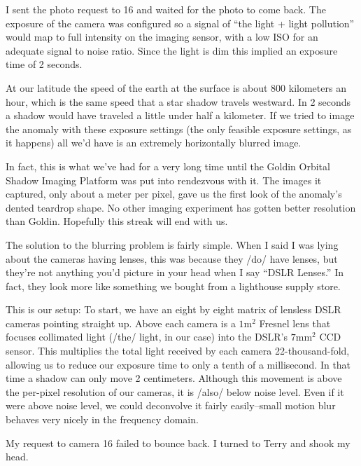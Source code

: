 \documentclass[a5paper,10pt]{book}
\begin{document}
I sent the photo request to 16 and waited for the photo to come back. The exposure of the camera was configured so a signal of ``the light + light pollution'' would map to full intensity on the imaging sensor, with a low ISO for an adequate signal to noise ratio. Since the light is dim this implied an exposure time of 2 seconds.

At our latitude the speed of the earth at the surface is about 800 kilometers an hour, which is the same speed that a star shadow travels westward. In 2 seconds a shadow would have traveled a little under half a kilometer. If we tried to image the anomaly with these exposure settings (the only feasible exposure settings, as it happens) all we'd have is an extremely horizontally blurred image.

In fact, this is what we've had for a very long time until the Goldin Orbital Shadow Imaging Platform was put into rendezvous with it. The images it captured, only about a meter per pixel, gave us the first look of the anomaly's dented teardrop shape. No other imaging experiment has gotten better resolution than Goldin. Hopefully this streak will end with us.

The solution to the blurring problem is fairly simple. When I said I was lying about the cameras having lenses, this was because they /do/ have lenses, but they're not anything you'd picture in your head when I say ``DSLR Lenses.'' In fact, they look more like something we bought from a lighthouse supply store.

This is our setup: To start, we have an eight by eight matrix of lensless DSLR cameras pointing straight up. Above each camera is a $1\mathrm{m}^2$ Fresnel lens that focuses collimated light (/the/ light, in our case) into the DSLR's $7\mathrm{mm}^2$ CCD sensor. This multiplies the total light received by each camera 22-thousand-fold, allowing us to reduce our exposure time to only a tenth of a millisecond. In that time a shadow can only move 2 centimeters. Although this movement is above the per-pixel resolution of our cameras, it is /also/ below noise level. Even if it were above noise level, we could deconvolve it fairly easily--small motion blur behaves very nicely in the frequency domain.

My request to camera 16 failed to bounce back. I turned to Terry and shook my head.
\end{document}
